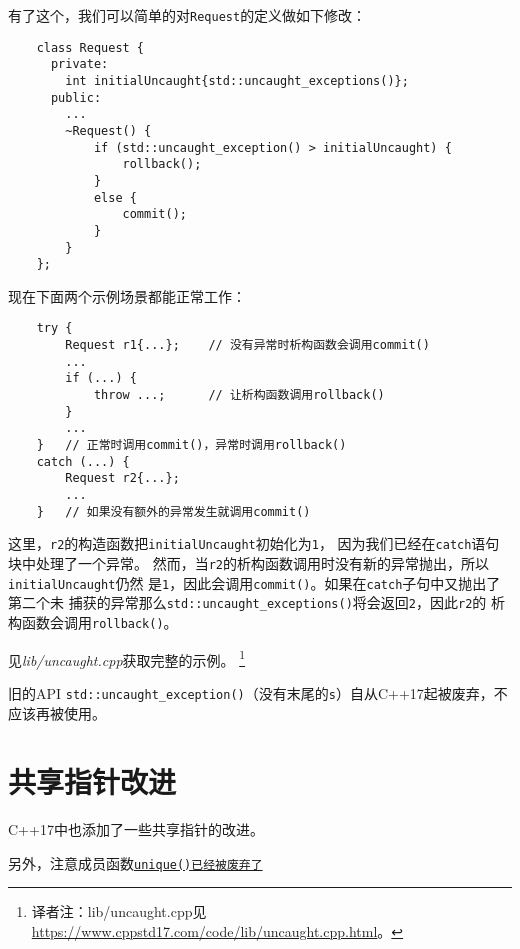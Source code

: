 有了这个，我们可以简单的对\texttt{Request}的定义做如下修改：
\begin{lstlisting}
    class Request {
      private:
        int initialUncaught{std::uncaught_exceptions()};
      public:
        ...
        ~Request() {
            if (std::uncaught_exception() > initialUncaught) {
                rollback();
            }
            else {
                commit();
            }
        }
    };
\end{lstlisting}
现在下面两个示例场景都能正常工作：
\begin{lstlisting}
    try {
        Request r1{...};    // 没有异常时析构函数会调用commit()
        ...
        if (...) {
            throw ...;      // 让析构函数调用rollback()
        }
        ...
    }   // 正常时调用commit()，异常时调用rollback()
    catch (...) {
        Request r2{...};
        ...
    }   // 如果没有额外的异常发生就调用commit()
\end{lstlisting}
这里，\texttt{r2}的构造函数把\texttt{initialUncaught}初始化为\texttt{1}，
因为我们已经在\texttt{catch}语句块中处理了一个异常。
然而，当\texttt{r2}的析构函数调用时没有新的异常抛出，所以\texttt{initialUncaught}仍然
是\texttt{1}，因此会调用\texttt{commit()}。如果在\texttt{catch}子句中又抛出了第二个未
捕获的异常那么\texttt{std::uncaught\_exceptions()}将会返回\texttt{2}，因此\texttt{r2}的
析构函数会调用\texttt{rollback()}。

见\emph{lib/uncaught.cpp}获取完整的示例。
\footnote{译者注：lib/uncaught.cpp见\url{https://www.cppstd17.com/code/lib/uncaught.cpp.html}。}

旧的API \texttt{std::uncaught\_exception()}（没有末尾的\texttt{s}）自从C++17起被废弃，不应该再被使用。


\section{共享指针改进}
C++17中也添加了一些共享指针的改进。

另外，注意成员函数\hyperref[ch35.2.7]{\texttt{unique()已经被废弃了}}

